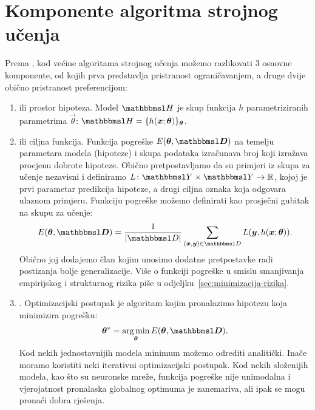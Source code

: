\documentclass[utf8, diplomski, lmodern]{fer}
\begin{document}
\section{Komponente algoritma strojnog učenja}

Prema \citet{Snajder:2014:SU}, kod većine algoritama strojnog učenja možemo razlikovati $3$ osnovne komponente, od kojih prva predstavlja pristranost ograničavanjem, a druge dvije obično pristranost preferencijom:
\begin{enumerate}[topsep=0pt,itemsep=0pt,partopsep=0pt]
	\item {} ili prostor hipoteza. Model $\set H$ je skup funkcija $h$  parametriziranih parametrima $\vec\theta$: $\set H=\cbr{h(\vec x;\vec{\theta})}_{\vec{\theta}}$.
	\item {} ili ciljna funkcija. Funkcija pogreške $E(\vec{\theta,\set D})$ na temelju parametara modela (hipoteze) i skupa podataka izračunava broj koji izražava procjenu dobrote hipoteze. Obično pretpostavljamo da su primjeri iz skupa za učenje nezavisni i definiramo  $\funcdef{L}{\set Y\times\set Y}{\R}$, kojoj je prvi parametar predikcija hipoteze, a drugi ciljna oznaka koja odgovara ulaznom primjeru. Funkciju pogreške možemo definirati kao prosječni gubitak na skupu za učenje:
	\begin{align}
	E(\vec{\theta,\set D})=\frac{1}{\envert{\set D}}\sum_{(\vec x,\vec y)\in\set D} L(\vec y,h(\vec x;\vec{\theta})) \text{.}
	\end{align}
	Obično joj dodajemo  član kojim unosimo dodatne pretpostavke radi postizanja bolje generalizacije. Više o funkciji pogreške u smislu smanjivanja empirijskog i strukturnog rizika piše u odjeljku~\ref{sec:minimizacija-rizika}.
	\item {}. Optimizacijski postupak je algoritam kojim pronalazimo hipotezu koja minimizira pogrešku:
	\begin{align}
	\vec\theta^* = \argmin_{\vec{\theta}} E(\vec{\theta,\set D}) \text{.}
	\end{align}
	Kod nekih jednostavnijih modela minimum možemo odrediti analitički. Inače moramo koristiti neki iterativni optimizacijski postupak. Kod nekih složenijih modela, kao što su neuronske mreže, funkcija pogreške nije unimodalna i vjerojatnost pronalaska globalnog optimuma je zanemariva, ali ipak se mogu pronaći dobra rješenja.
\end{enumerate}
\end{document}
